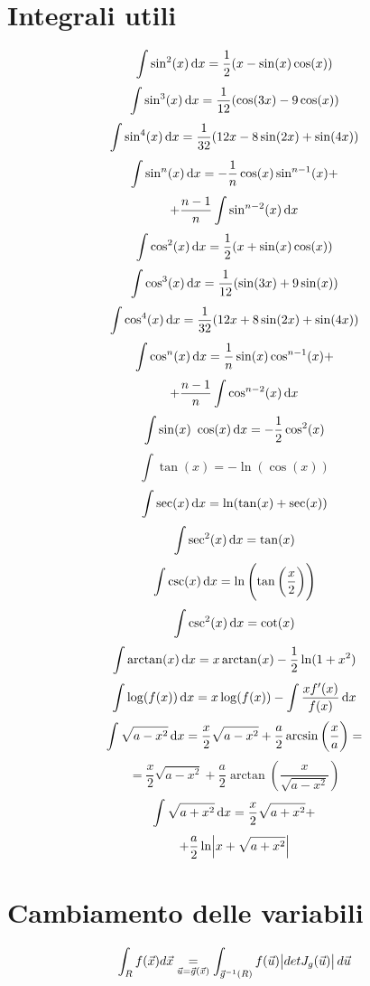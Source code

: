 \documentclass[a4paper,portrait,columns=3,5pt]{cheatsheet}
\begin{document}
\section{Integrali utili}
$$ \int \sin^2(x) \dif x = \frac{1}{2} (x - \sin(x) \cos(x)) $$
$$ \int \sin^3(x) \dif x = \frac{1}{12} (\cos(3x)-9\cos(x)) $$
$$ \int \sin^4(x) \dif x = \frac{1}{32} (12x - 8\sin(2x)+\sin(4x)) $$
$$ \int \sin^n(x) \dif x = -\frac{1}{n} \cos(x) \sin^{n-1}(x) + $$ 
$$ + \frac{n-1}{n} \int \sin^{n-2}(x) \dif x $$
$$ \int \cos^2(x) \dif x = \frac{1}{2} (x + \sin(x)\cos(x)) $$
$$ \int \cos^3(x) \dif x = \frac{1}{12} (\sin(3x) + 9\sin(x))$$
$$ \int \cos^4(x) \dif x = \frac{1}{32} (12 x + 8\sin(2x)+\sin(4x))$$
$$ \int \cos^n(x) \dif x = \frac{1}{n} \sin(x) \cos^{n-1}(x) + $$
$$ + \frac{n-1}{n} \int \cos^{n-2}(x) \dif x $$
$$ \int \sin(x) ~ \cos(x) \dif x = -\frac{1}{2} \cos^2(x) $$ 
$$ \int \tan(x) = -\ln(\cos(x)) $$
$$ \int \sec(x) \dif x = \ln (\tan(x) + \sec(x)) $$
$$ \int \sec^2(x) \dif x = \tan(x) $$
$$ \int \csc (x) \dif x = \ln \left( \tan\left(\frac{x}{2}\right)\right)$$
$$ \int \csc^2(x) \dif x = \cot(x) $$
$$ \int \arctan(x) \dif x = x \arctan(x) - \frac{1}{2} \ln (1 + x^2)$$
$$ \int \log(f(x)) \dif x = x \log (f(x)) - \int \frac{x f'(x)}{f(x)} \dif x $$
$$ \int \sqrt{a - x^2} \dif x = \frac{x}{2} \sqrt{a - x^2} + \frac{a}{2} \arcsin \left(\frac {x}{a}\right) = $$
$$ =  \frac{x}{2} \sqrt{a - x^2} + \frac{a}{2} \arctan \left(\frac{x}{\sqrt{a-x^2}}\right) $$
$$ \int \sqrt{a + x^2} \dif x =  \frac{x}{2} \sqrt{a + x^2} + $$ 
$$ + \frac{a}{2} \ln \abs{x + \sqrt{a+x^2}} $$

\section{Cambiamento delle variabili}
\begin{equation*}
	\int_R f(\vec {x}) d\vec{x} \underset{{\vec{u} = \vec{g} (\vec{x})}}{=} \int_{\vec{g}^{-1}(R)} f(\vec {u}) \abs{det J_g(\vec u)} d\vec{u}
\end{equation*}
\end{document}
